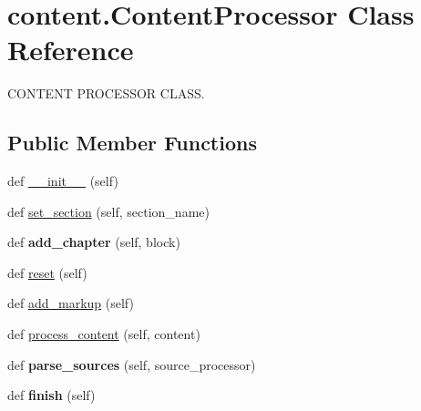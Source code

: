 \hypertarget{classcontent_1_1_content_processor}{}\section{content.\+Content\+Processor Class Reference}
\label{classcontent_1_1_content_processor}


C\+O\+N\+T\+E\+NT P\+R\+O\+C\+E\+S\+S\+OR C\+L\+A\+SS.  


\subsection*{Public Member Functions}
\begin{DoxyCompactItemize}
\item 
def \hyperlink{classcontent_1_1_content_processor_ab89414a8a63232189c5433fcd450a030}{\+\_\+\+\_\+init\+\_\+\+\_\+} (self)
\item 
def \hyperlink{classcontent_1_1_content_processor_a14e1401ef31e9e27d18a5d526697305f}{set\+\_\+section} (self, section\+\_\+name)
\item 
\mbox{\label{classcontent_1_1_content_processor_a54deb52db427259b6920886464b00e9e}} 
def {\bfseries add\+\_\+chapter} (self, block)
\item 
def \hyperlink{classcontent_1_1_content_processor_a50270833594711e862d06e5fea9131fa}{reset} (self)
\item 
def \hyperlink{classcontent_1_1_content_processor_a80c9aef136880bba3d0575785bcc1794}{add\+\_\+markup} (self)
\item 
def \hyperlink{classcontent_1_1_content_processor_ad0b20f704dbd7460afd09fa05b898b1a}{process\+\_\+content} (self, content)
\item 
\mbox{\label{classcontent_1_1_content_processor_a06d2a324c061c6dd00ec01a384a68670}} 
def {\bfseries parse\+\_\+sources} (self, source\+\_\+processor)
\item 
\mbox{\label{classcontent_1_1_content_processor_a77176cbb2931648a2d1d1796a08937f0}} 
def {\bfseries finish} (self)
\end{DoxyCompactItemize}
